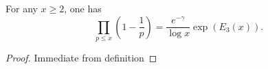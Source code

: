\begin{theorem}
\label{Mertens-third-theorem-error}
\leanok
For any $x \geq 2$, one has
$$ \prod_{p \leq x} \left(1 - \frac{1}{p}\right) = \frac{e^{-\gamma}}{\log x} \exp(E_3(x)). $$
\end{theorem}
\begin{proof}
\leanok
Immediate from definition
\end{proof}
